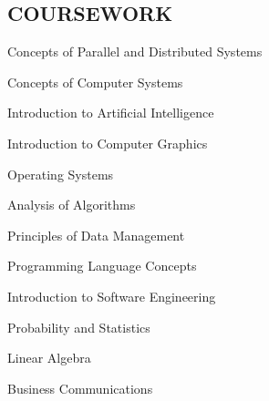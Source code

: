 \documentclass[line, resmargin]{res}
\begin{document}
\begin{resume}
\section{COURSEWORK}
      \begin{enumerate*}[series=MyList, before=\hspace{-0.6ex}, label=\textbullet]
        \item Concepts of Parallel and Distributed Systems
        \item Concepts of Computer Systems
        \item Introduction to Artificial Intelligence
        \item Introduction to Computer Graphics
        \item Operating Systems
        \item Analysis of Algorithms
        \item Principles of Data Management
        \item Programming Language Concepts
        \item Introduction to Software Engineering
        \item Probability and Statistics
        \item Linear Algebra
        \item Business Communications
      \end{enumerate*}

 
\end{resume}
\end{document}
